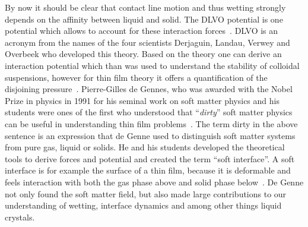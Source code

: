 By now it should be clear that contact line motion and thus wetting strongly depends on the affinity between liquid and solid. 
The DLVO potential is one potential which allows to account for these interaction forces~\cite{vActaPhysicochim1941, verweyTheoryStabilityLyophobic}. 
DLVO is an acronym from the names of the four scientists Derjaguin, Landau, Verwey and Overbeek who developed this theory. 
Based on the theory one can derive an interaction potential which than was used to understand the stability of colloidal suspensions, however for thin film theory it offers a quantification of the disjoining pressure~\cite{oronLongscaleEvolutionThin1997, peschkaSignaturesSlipDewetting2019, moultonEffectDisjoiningPressure2013, diezGlobalModelsMoving2000}.
Pierre-Gilles de Gennes, who was awarded with the Nobel Prize in physics in 1991 for his seminal work on soft matter physics and his students were ones of the first who understood that ``\textit{dirty}'' soft matter physics can be useful in understanding thin film problems~\cite{degennesWettingStaticsDynamics1985,degennesFluidWallSlippage2002,degennesCapillarityWettingPhenomena2004}.
The term dirty in the above sentence is an expression that de Genne used to distinguish soft matter systems from pure gas, liquid or solids. 
He and his students developed the theoretical tools to derive forces and potential and created the term ``soft interface''.
A soft interface is for example the surface of a thin film, because it is deformable and feels interaction with both the gas phase above and solid phase below~\cite{degennesCapillarityWettingPhenomena2004}.
De Genne not only found the soft matter field, but also made large contributions to our understanding of wetting, interface dynamics and among other things liquid crystals.


